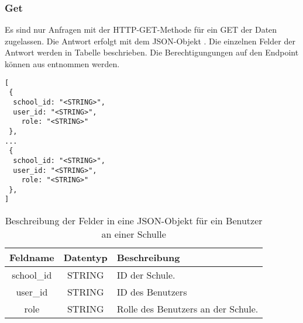 \subsubsection{Get}
\label{sec:end:rest:api:school:users:get}
Es sind nur Anfragen mit der HTTP-GET-Methode für ein GET der Daten zugelassen.
Die Antwort erfolgt mit dem JSON-Objekt . Die einzelnen Felder der Antwort werden in Tabelle  beschrieben.
Die Berechtigungungen auf den Endpoint können aus  entnommen werden.

\begin{lstlisting}[caption={JSON-Antwort für einen GET-Aufruf der Route /api/school/users},label={lst:code:end:rest:api:school:users:get:ret},frame=tlrb]
[
 {
  school_id: "<STRING>",
  user_id: "<STRING>",
	role: "<STRING>"
 },
...
 {
  school_id: "<STRING>",
  user_id: "<STRING>",
	role: "<STRING>"
 },
]
\end{lstlisting}

\begin{table}[htb]
	\begin{tabularx}{\textwidth}{|c|c|X|}
		\hline
			\textbf{Feldname} & \textbf{Datentyp} & \textbf{Beschreibung} \\ \hline
			school\_id & STRING & ID der Schule. \\ \hline
			user\_id & STRING & ID des Benutzers \\ \hline
			role & STRING & Rolle des Benutzers an der Schule. \\ \hline
	\end{tabularx}

		\caption{Beschreibung der Felder in eine JSON-Objekt für ein Benutzer an einer Schulle}
		\label{tab:end:rest:api:school:users:get:ret:json}
\end{table}

